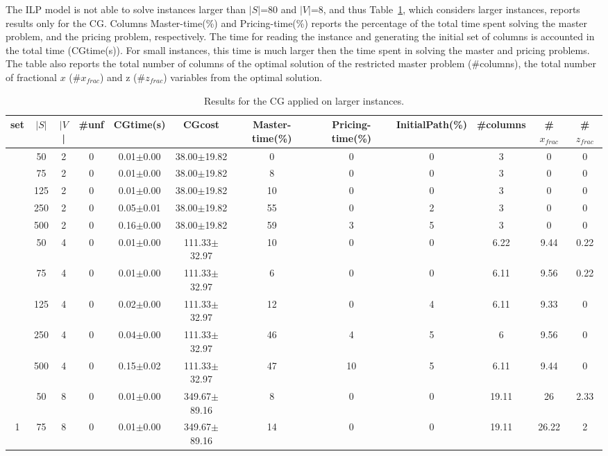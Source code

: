 \documentclass{llncs}
\begin{document}
The ILP model is not able to solve instances larger than $|S|$=80 and $|V|$=8, and thus Table~\ref{tab:full}, which considers larger instances, reports results only for the CG.
Columns Master-time(\%) and  Pricing-time(\%) reports the percentage of the total time spent solving the master problem, and the pricing problem, respectively.
The time for reading the instance and generating the initial set of columns is accounted in the total time (CGtime(s)).
For small instances, this time is much larger then the time spent in solving the master and pricing problems.
The table also reports the total number of columns of the optimal solution of the restricted master problem (\#columns),
the total number of fractional $x$ (\#$x_{frac}$) and z (\#$z_{frac}$) variables from the optimal solution.


\begin{table}[h]
\begin{center}
  \caption{Results for the CG applied on larger instances. \label{tab:full}}
  \begin{tabular}{c c c c c c c c c c c c}
set & $|S|$ & $|V$| & \#unf  &  CGtime(s)  &  CGcost   &  Master-time(\%)  &  Pricing-time(\%) & InitialPath(\%)  &  \#columns  &  \#$x_{frac}$  &  \#$z_{frac}$ \\
\hline
&50&2&0&  0.01$\pm$0.00  &  38.00$\pm$19.82    &0&0&0&3&0&0\\
&75&2&0&  0.01$\pm$0.00  &  38.00$\pm$19.82    &8&0&0&3&0&0\\
&125&2&0&  0.01$\pm$0.00  &  38.00$\pm$19.82    &10&0&0&3&0&0\\
&250&2&0&  0.05$\pm$0.01  &  38.00$\pm$19.82    &55&0&2&3&0&0\\
&500&2&0&  0.16$\pm$0.00  &  38.00$\pm$19.82    &59&3&5&3&0&0\\
&50&4&0&  0.01$\pm$0.00  &  111.33$\pm$32.97   &10&0&0&6.22&9.44&0.22\\
&75&4&0&  0.01$\pm$0.00  &  111.33$\pm$32.97   &6&0&0&6.11&9.56&0.22\\
&125&4&0&  0.02$\pm$0.00  &  111.33$\pm$32.97   &12&0&4&6.11&9.33&0\\
&250&4&0&  0.04$\pm$0.00  &  111.33$\pm$32.97   &46&4&5&6&9.56&0\\
&500&4&0&  0.15$\pm$0.02  &  111.33$\pm$32.97   &47&10&5&6.11&9.44&0\\
&50&8&0&  0.01$\pm$0.00  &  349.67$\pm$89.16   &8&0&0&19.11&26&2.33\\
1&75&8&0&  0.01$\pm$0.00  &  349.67$\pm$89.16   &14&0&0&19.11&26.22&2\\

\end{tabular}
\end{center}
\end{table}
\end{document}
